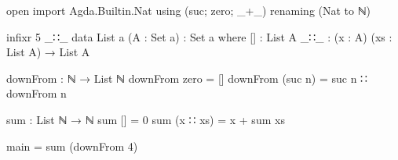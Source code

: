 \documentclass{article}
\begin{document}
\begin{code}
open import Agda.Builtin.Nat using (suc; zero; _+_) renaming (Nat to ℕ) 

infixr 5 _∷_
data List {a} (A : Set a) : Set a where
  []  : List A
  _∷_ : (x : A) (xs : List A) → List A

downFrom : ℕ → List ℕ
downFrom zero = []
downFrom (suc n) = suc n ∷ downFrom n 

sum : List ℕ → ℕ
sum [] = 0
sum (x ∷ xs) = x + sum xs

main = sum (downFrom 4)


\end{code}
\end{document}
